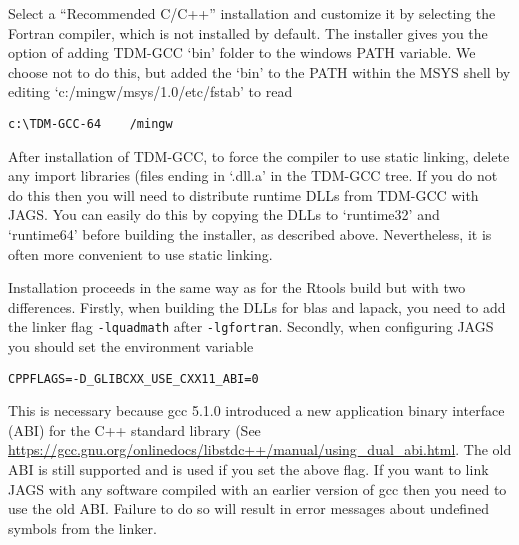 \documentclass[11pt, a4paper, titlepage]{article}
\newcommand{\file}[1]{{`\normalfont\textsf{#1}'}}
\begin{document}
Select a ``Recommended C/C++'' installation and customize it by
selecting the Fortran compiler, which is not installed by default. The
installer gives you the option of adding TDM-GCC \file{bin} folder to
the windows PATH variable. We choose not to do this, but added the
\file{bin} to the PATH within the MSYS shell by editing
\file{c:/mingw/msys/1.0/etc/fstab} to read
\begin{verbatim}
c:\TDM-GCC-64    /mingw
\end{verbatim}
After installation of TDM-GCC, to force the compiler to use static
linking, delete any import libraries (files ending in \file{.dll.a} in
the TDM-GCC tree. If you do not do this then you will need to
distribute runtime DLLs from TDM-GCC with JAGS. You can easily do this
by copying the DLLs to \file{runtime32} and \file{runtime64} before
building the installer, as described above. Nevertheless, it is often
more convenient to use static linking.

Installation proceeds in the same way as for the Rtools build but with
two differences.  Firstly, when building the DLLs for blas and lapack,
you need to add the linker flag \verb+-lquadmath+ after
\verb+-lgfortran+. Secondly, when configuring JAGS you should set the
environment variable
\begin{verbatim}
CPPFLAGS=-D_GLIBCXX_USE_CXX11_ABI=0 
\end{verbatim}
This is necessary because gcc 5.1.0 introduced a new application
binary interface (ABI) for the C++ standard library (See
\url{https://gcc.gnu.org/onlinedocs/libstdc++/manual/using_dual_abi.html}. The
old ABI is still supported and is used if you set the above flag. If
you want to link JAGS with any software compiled with an earlier
version of gcc then you need to use the old ABI. Failure to do so will
result in error messages about undefined symbols from the linker.
\end{document}

